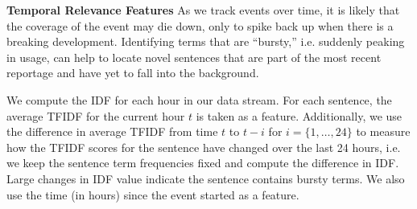 



\textbf{Temporal Relevance Features}
As we track events over time, it is likely that the coverage of the event 
may die down, only to spike back up when there is a breaking development.
Identifying terms that are ``bursty,'' i.e. suddenly peaking in usage,
can help to locate novel sentences that are part of the most recent reportage
and have yet to fall into the background.

We compute the IDF for each hour in our data stream. 
For each sentence, the average TFIDF for the current hour $t$ is taken as a 
feature. Additionally, we use the difference in average TFIDF from time $t$
to $t-i$ for $i = \{1, \ldots, 24\}$ to measure how the TFIDF scores for the 
sentence have changed over the last 24 hours, i.e. we keep the sentence
term frequencies fixed and compute the difference in IDF. Large changes
in IDF value indicate the sentence contains bursty terms.
We also use the time (in hours) since the event started as a feature.

